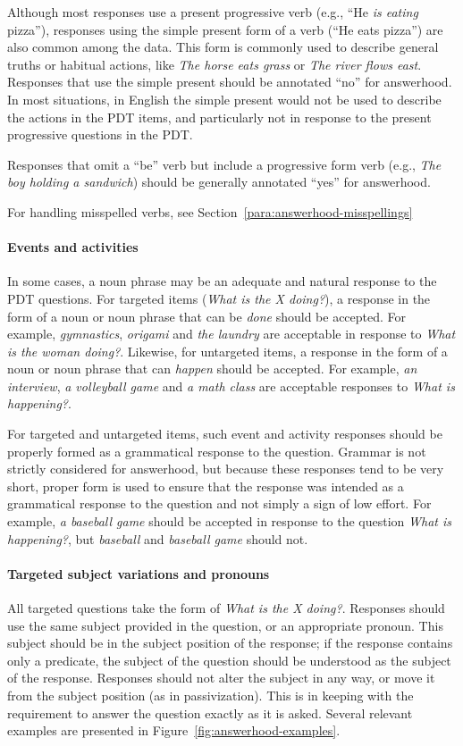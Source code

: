 \documentclass[12pt,notitlepage]{article}
\begin{document}
Although most responses use a present progressive  verb (e.g., ``He \textit{is eating} pizza''), responses using the simple present form of a verb (``He eats pizza'') are also common among the data. This form is commonly used to describe general truths or habitual actions, like \textit{The horse eats grass} or \textit{The river flows east}. Responses that use the simple present should be annotated ``no'' for answerhood. In most situations, in English the simple present would not be used to describe the actions in the PDT items, and particularly not in response to the present progressive questions in the PDT.

Responses that omit a ``be'' verb but include a progressive form verb (e.g., \textit{The boy holding a sandwich}) should be generally annotated ``yes'' for answerhood.

For handling misspelled verbs, see Section~\ref{para:answerhood-misspellings}

\paragraph{Events and activities}
\label{para:answerhood-events}
In some cases, a noun phrase may be an adequate and natural response to the PDT questions. For targeted items (\textit{What is the X doing?}), a response in the form of a noun or noun phrase that can be \textit{done} should be accepted. For example, \textit{gymnastics}, \textit{origami} and \textit{the laundry} are acceptable in response to \textit{What is the woman doing?}. Likewise, for untargeted items, a response in the form of a noun or noun phrase that can \textit{happen} should be accepted. For example, \textit{an interview}, \textit{a volleyball game} and \textit{a math class} are acceptable responses to \textit{What is happening?}.

For targeted and untargeted items, such event and activity responses should be properly formed as a grammatical response to the question. Grammar is not strictly considered for answerhood, but because these responses tend to be very short, proper form is used to ensure that the response was intended as a grammatical response to the question and not simply a sign of low effort. For example, \textit{a baseball game} should be accepted in response to the question \textit{What is happening?}, but \textit{baseball} and \textit{baseball game} should not.

\paragraph{Targeted subject variations and pronouns}
All targeted questions take the form of \textit{What is the X doing?}. Responses should use the same subject provided in the question, or an appropriate pronoun. This subject should be in the subject position of the response; if the response contains only a predicate, the subject of the question should be understood as the subject of the response. Responses should not alter the subject in any way, or move it from the subject position (as in passivization). This is in keeping with the requirement to answer the question exactly as it is asked. Several relevant examples are presented in Figure~\ref{fig:answerhood-examples}.
\end{document}
